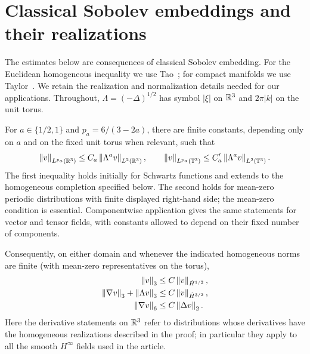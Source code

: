 \section{Classical Sobolev embeddings and their realizations}\label{sec:critical-appendix}
The estimates below are consequences of classical Sobolev embedding.
For the Euclidean homogeneous inequality we use
Tao~\cite[Appendix~A, equation~(A.11)]{taodispersive}; for compact
manifolds we use Taylor~\cite[Chapter~13, Proposition~6.4 and the
preceding discussion]{taylor2011iii}. We retain the realization and
normalization details needed for our applications.
Throughout, $\Lambda=(-\Delta)^{1/2}$ has symbol $|\xi|$ on $\mathbb R^3$
and $2\pi|k|$ on the unit torus.

\begin{lemma}\label{lem:critical-embeddings}
For $a\in\{1/2,1\}$ and $p_a=6/(3-2a)$, there are finite constants,
depending only on $a$ and on the fixed unit torus when relevant, such that
\begin{equation}\label{eq:critical-embedding-pair}
 \left\lVert v\right\rVert_{L^{p_a}(\mathbb R^3)}\le C_a\left\lVert\Lambda^a v\right\rVert_{L^2(\mathbb R^3)},
 \qquad
 \left\lVert v\right\rVert_{L^{p_a}(\mathbb T^3)}\le C_a'\left\lVert\Lambda^a v\right\rVert_{L^2(\mathbb T^3)}.
\end{equation}
The first inequality holds initially for Schwartz functions and extends
to the homogeneous completion specified below.  The second holds for
mean-zero periodic distributions with finite displayed right-hand side;
the mean-zero condition is essential.  Componentwise application gives
the same statements for vector and tensor fields, with constants allowed
to depend on their fixed number of components.

Consequently, on either domain and whenever the indicated homogeneous
norms are finite (with mean-zero representatives on the torus),
\begin{align}
 \left\lVert v\right\rVert_3&\le C\left\lVert v\right\rVert_{\dot H^{1/2}},\nonumber\\
 \left\lVert\nabla v\right\rVert_3+\left\lVert\Lambda v\right\rVert_3
   &\le C\left\lVert v\right\rVert_{\dot H^{3/2}},\label{eq:critical-derived}\\
 \left\lVert\nabla v\right\rVert_6&\le C\left\lVert\Delta v\right\rVert_2.\nonumber
\end{align}
Here the derivative statements on $\mathbb R^3$ refer to distributions whose
derivatives have the homogeneous realizations described in the proof;
in particular they apply to all the smooth $H^\infty$ fields used in
the article.
\end{lemma}

